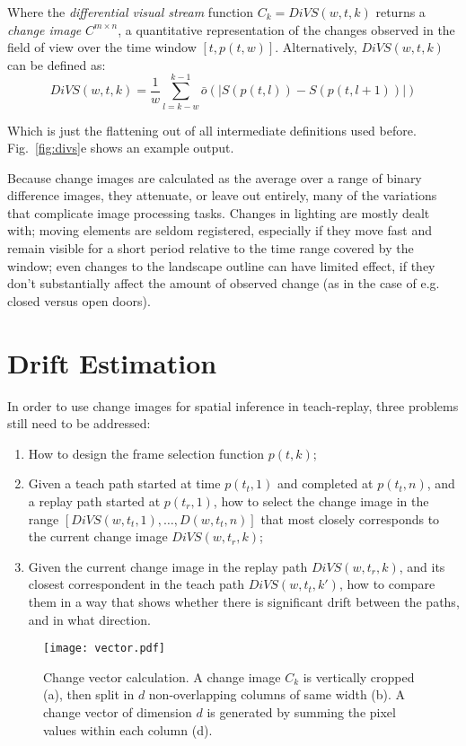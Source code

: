 \documentclass[twocolumn, 9pt,fleqn]{jsproceedings}
\begin{document}
Where the \textit{differential visual stream} function $C_k = DiVS(w, t, k)$ returns a  \textit{change image} $C^{m \times n}$, a quantitative representation of the changes observed in the field of view over the time window $[t, p(t, w)]$. Alternatively, $DiVS(w, t, k)$ can be defined as:
\begin{equation}
DiVS(w, t, k) = \frac{1}{w} \sum_{l=k-w}^{k-1}{\bar{o}(|S(p(t, l)) - S(p(t, l+1))|)}
\end{equation}

Which is just the flattening out of all intermediate definitions used before. Fig.~\ref{fig:divs}e shows an example output.

Because change images are calculated as the average over a range of binary difference images, they attenuate, or leave out entirely, many of the variations that complicate image processing tasks. Changes in lighting are mostly dealt with; moving elements are seldom registered, especially if they move fast and remain visible for a short period relative to the time range covered by the window; even changes to the landscape outline can have limited effect, if they don't substantially affect the amount of observed change (as in the case of e.g. closed versus open doors).

\section{Drift Estimation}

In order to use change images for spatial inference in teach-replay, three problems still need to be addressed:

\begin{enumerate}
\item How to design the frame selection function $p(t, k)$;
\item Given a teach path started at time $p(t_t, 1)$ and completed at $p(t_t, n)$, and a replay path started at $p(t_r, 1)$, how to select the change image in the range $[DiVS(w, t_t, 1), \dotsc, D(w, t_t, n)]$ that most closely corresponds to the current change image $DiVS(w, t_r, k)$;
\item Given the current change image in the replay path $DiVS(w, t_r, k)$, and its closest correspondent in the teach path $DiVS(w, t_t, k')$, how to compare them in a way that shows whether there is significant drift between the paths, and in what direction.
\end{enumerate}

\begin{figure}[b]
\texttt{[image: vector.pdf]}
\caption{Change vector calculation. A change image $C_k$ is vertically cropped (a), then split in $d$ non-overlapping columns of same width (b). A change vector of dimension $d$ is generated by summing the pixel values within each column (d).}
\label{fig:vector}
\end{figure}
\end{document}
